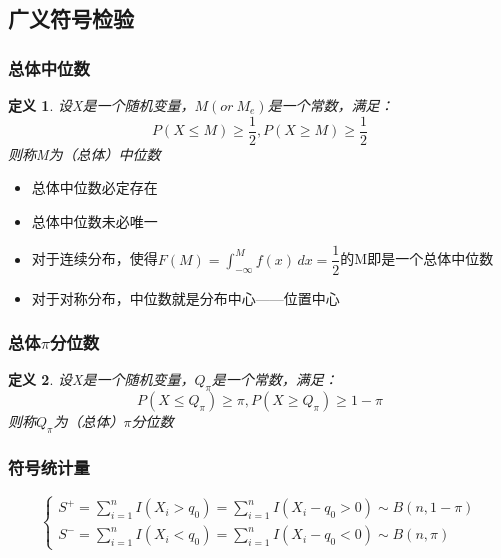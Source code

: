 \documentclass[UTF8]{ctexart}
\numberwithin{equation}{section}
\newtheorem{definition}{定义}[section]
\begin{document}
\subsection{广义符号检验}
\subsubsection{总体中位数}
\begin{definition}
    设X是一个随机变量，$M(or~M_e)$是一个常数，满足：
    \begin{equation}
        P(X \leq M) \geq \dfrac{1}{2},P(X \geq M) \geq \dfrac{1}{2}
        \nonumber
    \end{equation}
    则称M为（总体）中位数
\end{definition}

\begin{itemize}
    \item 总体中位数必定存在
    \item 总体中位数未必唯一
    \item 对于连续分布，使得$F(M)=\int_{-\infty}^M f(x) \,dx = \dfrac{1}{2}$的M即是一个总体中位数
    \item 对于对称分布，中位数就是分布中心——位置中心
\end{itemize}

\subsubsection{总体$\pi$分位数}
\begin{definition}
    设X是一个随机变量，$Q_{\pi}$是一个常数，满足：
    \begin{equation}
        P(X \leq Q_{\pi}) \geq \pi,P(X \geq Q_{\pi}) \geq 1-\pi
        \nonumber
    \end{equation}
    则称$Q_{\pi}$为（总体）$\pi$分位数
\end{definition}

\subsubsection{符号统计量}
\begin{equation}
    \begin{cases}
        S^+ = \sum_{i=1}^{n} I(X_i > q_0) = \sum_{i=1}^{n} I(X_i - q_0 > 0) \sim B(n, 1-\pi) \\[1em]
        S^- = \sum_{i=1}^{n} I(X_i < q_0) = \sum_{i=1}^{n} I(X_i - q_0 < 0) \sim B(n, \pi)
    \end{cases}
\end{equation}
\end{document}
